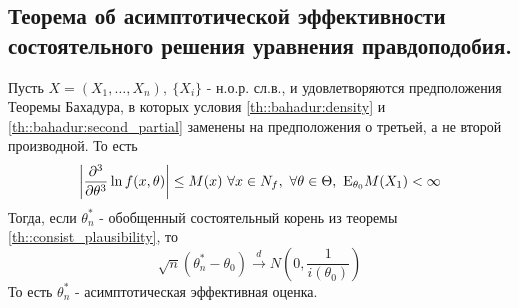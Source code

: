 \subsection{Теорема об асимптотической эффективности состоятельного решения уравнения правдоподобия.}
\begin{theorem}
    \label{th::asympt_consist}
    Пусть \(X = (X_1, \ldots, X_n),\ \{X_i\}\) - н.о.р. сл.в., и
    удовлетворяются предположения Теоремы Бахадура, в которых условия
    \ref{th::bahadur:density} и \ref{th::bahadur:second_partial} заменены на
    предположения о третьей, а не второй производной. То есть
    \[\left\lvert \frac{\partial^3}{\partial \theta^3} \ln f(x, \theta) \right\rvert  \leq M(x) \ \forall x\in N_f,\ \forall\theta\in\Theta,\ \E_{\theta_0}M(X_1) < \infty\]
    Тогда, если \(\theta^*_n\) - обобщенный состоятельный корень из теоремы \ref{th::consist_plausibility}, то
    \[\sqrt{n}(\theta^*_n - \theta_0) \xrightarrow{d} N(0, \frac{1}{i(\theta_0)})\]
    То есть \(\theta^*_n\) - асимптотическая эффективная оценка.
\end{theorem}
